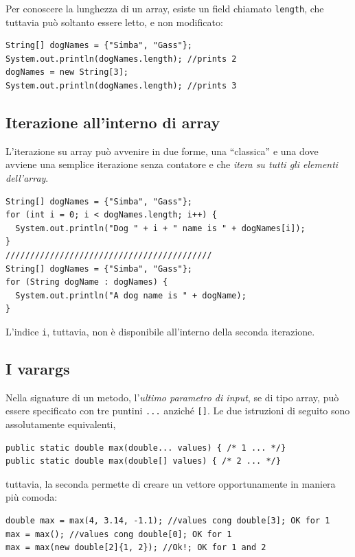 \documentclass[\fontsizeclass,twocolumn]{\classname}
\theoremstyle{definition}
\theoremstyle{definition}
\begin{document}
Per conoscere la lunghezza di un array, esiste un field chiamato
\texttt{length}, che tuttavia può soltanto essere letto, e non modificato:

\begin{lstlisting}
String[] dogNames = {"Simba", "Gass"};
System.out.println(dogNames.length); //prints 2
dogNames = new String[3];
System.out.println(dogNames.length); //prints 3
\end{lstlisting}

\subsection{Iterazione all'interno di array}

L'iterazione su array può avvenire in due forme, una ``classica'' e una dove
avviene una semplice iterazione senza contatore e che \emph{itera su tutti gli
elementi dell'array}.

\begin{lstlisting}
String[] dogNames = {"Simba", "Gass"};
for (int i = 0; i < dogNames.length; i++) {
  System.out.println("Dog " + i + " name is " + dogNames[i]);
}
//////////////////////////////////////////
String[] dogNames = {"Simba", "Gass"};
for (String dogName : dogNames) {
  System.out.println("A dog name is " + dogName);
}
\end{lstlisting}

L'indice \texttt{i}, tuttavia, non è disponibile all'interno della seconda
iterazione.

\subsection{I varargs}

Nella signature di un metodo, l'\emph{ultimo parametro di input}, se di tipo
array, può essere specificato con tre puntini \texttt{...} anziché \texttt{[]}.
Le due istruzioni di seguito sono assolutamente equivalenti,

\begin{lstlisting}
public static double max(double... values) { /* 1 ... */}
public static double max(double[] values) { /* 2 ... */}
\end{lstlisting}

tuttavia, la seconda permette di creare un vettore opportunamente in maniera
più comoda:

\begin{lstlisting}
double max = max(4, 3.14, -1.1); //values cong double[3]; OK for 1
max = max(); //values cong double[0]; OK for 1
max = max(new double[2]{1, 2}); //Ok!; OK for 1 and 2
\end{lstlisting}
\end{document}
